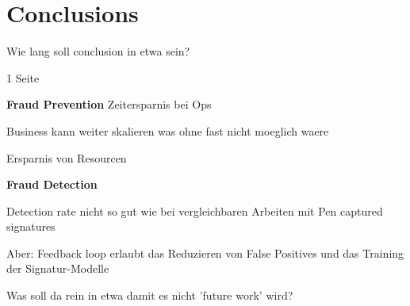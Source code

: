 \documentclass[a4paper, oneside]{csthesis}
\begin{document}





\chapter{Conclusions}

Wie lang soll conclusion in etwa sein?

1 Seite

\textbf{Fraud Prevention}
Zeitersparnis bei Ops

Business kann weiter skalieren was ohne fast nicht moeglich waere

Ersparnis von Resourcen

\textbf{Fraud Detection}

Detection rate nicht so gut wie bei vergleichbaren Arbeiten mit Pen captured signatures

Aber: Feedback loop erlaubt das Reduzieren von False Positives und das Training der Signatur-Modelle

Was soll da rein in etwa damit es nicht 'future work' wird?















\end{document}
